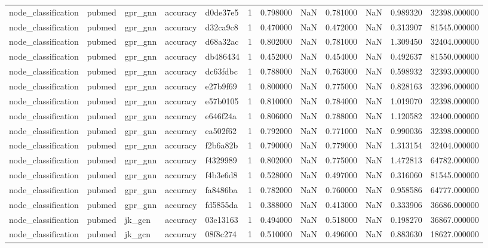 \begin{tabular}{lllllrrrrrrr}
node_classification & pubmed & gpr_gnn & accuracy & d0de37e5 & 1 & 0.798000 & NaN & 0.781000 & NaN & 0.989320 & 32398.000000 \\
node_classification & pubmed & gpr_gnn & accuracy & d32ca9c8 & 1 & 0.470000 & NaN & 0.472000 & NaN & 0.313907 & 81545.000000 \\
node_classification & pubmed & gpr_gnn & accuracy & d68a32ac & 1 & 0.802000 & NaN & 0.781000 & NaN & 1.309450 & 32404.000000 \\
node_classification & pubmed & gpr_gnn & accuracy & db486434 & 1 & 0.452000 & NaN & 0.454000 & NaN & 0.492637 & 81550.000000 \\
node_classification & pubmed & gpr_gnn & accuracy & dc63fdbc & 1 & 0.788000 & NaN & 0.763000 & NaN & 0.598932 & 32393.000000 \\
node_classification & pubmed & gpr_gnn & accuracy & e27b9f69 & 1 & 0.800000 & NaN & 0.775000 & NaN & 0.828163 & 32396.000000 \\
node_classification & pubmed & gpr_gnn & accuracy & e57b0105 & 1 & 0.810000 & NaN & 0.784000 & NaN & 1.019070 & 32398.000000 \\
node_classification & pubmed & gpr_gnn & accuracy & e646f24a & 1 & 0.806000 & NaN & 0.788000 & NaN & 1.120582 & 32400.000000 \\
node_classification & pubmed & gpr_gnn & accuracy & ea502f62 & 1 & 0.792000 & NaN & 0.771000 & NaN & 0.990036 & 32398.000000 \\
node_classification & pubmed & gpr_gnn & accuracy & f2b6a82b & 1 & 0.790000 & NaN & 0.779000 & NaN & 1.313154 & 32404.000000 \\
node_classification & pubmed & gpr_gnn & accuracy & f4329989 & 1 & 0.802000 & NaN & 0.775000 & NaN & 1.472813 & 64782.000000 \\
node_classification & pubmed & gpr_gnn & accuracy & f4b3e6d8 & 1 & 0.528000 & NaN & 0.497000 & NaN & 0.316060 & 81545.000000 \\
node_classification & pubmed & gpr_gnn & accuracy & fa8486ba & 1 & 0.782000 & NaN & 0.760000 & NaN & 0.958586 & 64777.000000 \\
node_classification & pubmed & gpr_gnn & accuracy & fd5855da & 1 & 0.388000 & NaN & 0.413000 & NaN & 0.333906 & 36686.000000 \\
node_classification & pubmed & jk_gcn & accuracy & 03e13163 & 1 & 0.494000 & NaN & 0.518000 & NaN & 0.198270 & 36867.000000 \\
node_classification & pubmed & jk_gcn & accuracy & 08f8c274 & 1 & 0.510000 & NaN & 0.496000 & NaN & 0.883630 & 18627.000000 \\

\end{tabular}
